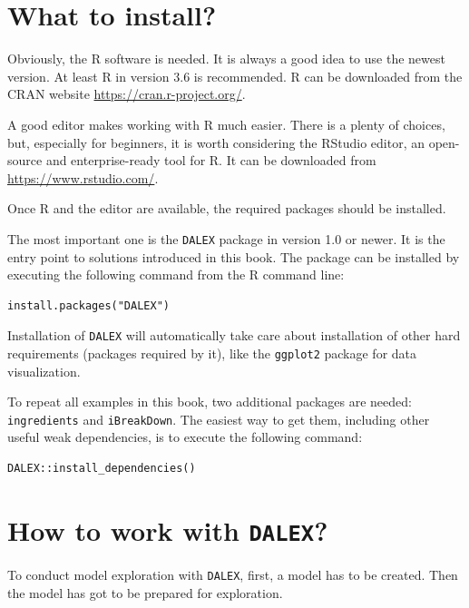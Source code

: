 \documentclass[]{krantz}
\begin{document}
\hypertarget{what-to-install}{%
\section{What to install?}\label{what-to-install}}

Obviously, the R software \citep{RcoreT} is needed. It is always a good idea to use the newest version. At least R in version 3.6 is recommended. R can be downloaded from the CRAN website \url{https://cran.r-project.org/}.

A good editor makes working with R much easier. There is a plenty of choices, but, especially for beginners, it is worth considering the RStudio editor, an open-source and enterprise-ready tool for R. It can be downloaded from \url{https://www.rstudio.com/}.

Once R and the editor are available, the required packages should be installed.

The most important one is the \texttt{DALEX} package in version 1.0 or newer. It is the entry point to solutions introduced in this book. The package can be installed by executing the following command from the R command line:

\begin{verbatim}
install.packages("DALEX")
\end{verbatim}

Installation of \texttt{DALEX} will automatically take care about installation of other hard requirements (packages required by it), like the \texttt{ggplot2} package for data visualization.

To repeat all examples in this book, two additional packages are needed: \texttt{ingredients} and \texttt{iBreakDown}. The easiest way to get them, including other useful weak dependencies, is to execute the following command:

\begin{verbatim}
DALEX::install_dependencies()
\end{verbatim}

\hypertarget{how-to-work-with-dalex}{%
\section{\texorpdfstring{How to work with \texttt{DALEX}?}{How to work with DALEX?}}\label{how-to-work-with-dalex}}

To conduct model exploration with \texttt{DALEX}, first, a model has to be created. Then the model has got to be prepared for exploration.
\end{document}
